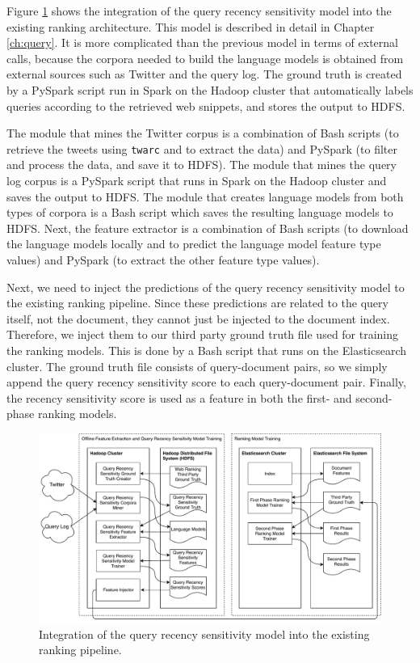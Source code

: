 Figure \ref{fig:querymodel} shows the integration of the query recency sensitivity model into the existing ranking architecture. This model is described in detail in Chapter \ref{ch:query}. It is more complicated than the previous model in terms of external calls, because the corpora needed to build the language models is obtained from external sources such as Twitter and the query log. The ground truth is created by a PySpark script run in Spark on the Hadoop cluster that automatically labels queries according to the retrieved web snippets, and stores the output to HDFS.

The module that mines the Twitter corpus is a combination of Bash scripts (to retrieve the tweets using \texttt{twarc} and to extract the data) and PySpark (to filter and process the data, and save it to HDFS). The module that mines the query log corpus is a PySpark script that runs in Spark on the Hadoop cluster and saves the output to HDFS. The module that creates language models from both types of corpora is a Bash script which saves the resulting language models to HDFS. Next, the feature extractor is a combination of Bash scripts (to download the language models locally and to predict the language model feature type values) and PySpark (to extract the other feature type values).

Next, we need to inject the predictions of the query recency sensitivity model to the existing ranking pipeline. Since these predictions are related to the query itself, not the document, they cannot just be injected to the document index. Therefore, we inject them to our third party ground truth file used for training the ranking models. This is done by a Bash script that runs on the Elasticsearch cluster. The ground truth file consists of query-document pairs, so we simply append the query recency sensitivity score to each query-document pair. Finally, the recency sensitivity score is used as a feature in both the first- and second-phase ranking models.

\begin{figure}
  \centering
  \includegraphics[width=\linewidth]{img/querymodel.pdf}
  \caption{Integration of the query recency sensitivity model into the existing ranking pipeline.}
  \label{fig:querymodel}
\end{figure}

